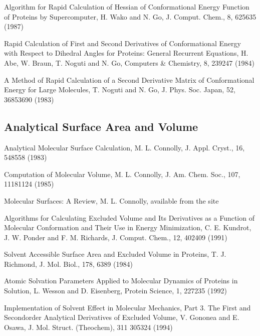 \documentclass[letterpaper,11pt,english]{sphinxmanual}
\begin{document}
\sphinxAtStartPar
Algorithm for Rapid Calculation of Hessian of Conformational Energy Function of Proteins by Supercomputer, H. Wako and N. Go, J. Comput. Chem., 8, 625\sphinxhyphen{}635 (1987)

\sphinxAtStartPar
Rapid Calculation of First and Second Derivatives of Conformational Energy with Respect to Dihedral Angles for Proteins: General Recurrent Equations, H. Abe, W. Braun, T. Noguti and N. Go, Computers \& Chemistry, 8, 239\sphinxhyphen{}247 (1984)

\sphinxAtStartPar
A Method of Rapid Calculation of a Second Derivative Matrix of Conformational Energy for Large Molecules, T. Noguti and N. Go, J. Phys. Soc. Japan, 52, 3685\sphinxhyphen{}3690 (1983)


\subsection{Analytical Surface Area and Volume}
\label{\detokenize{text/references:analytical-surface-area-and-volume}}
\sphinxAtStartPar
Analytical Molecular Surface Calculation, M. L. Connolly, J. Appl. Cryst., 16, 548\sphinxhyphen{}558 (1983)

\sphinxAtStartPar
Computation of Molecular Volume, M. L. Connolly, J. Am. Chem. Soc., 107, 1118\sphinxhyphen{}1124 (1985)

\sphinxAtStartPar
Molecular Surfaces: A Review, M. L. Connolly, available from the site 

\sphinxAtStartPar
Algorithms for Calculating Excluded Volume and Its Derivatives as a Function of Molecular Conformation and Their Use in Energy Minimization, C. E. Kundrot, J. W. Ponder and F. M. Richards, J. Comput. Chem., 12, 402\sphinxhyphen{}409 (1991)

\sphinxAtStartPar
Solvent Accessible Surface Area and Excluded Volume in Proteins, T. J. Richmond, J. Mol. Biol., 178, 63\sphinxhyphen{}89 (1984)

\sphinxAtStartPar
Atomic Solvation Parameters Applied to Molecular Dynamics of Proteins in Solution, L. Wesson and D. Eisenberg, Protein Science, 1, 227\sphinxhyphen{}235 (1992)

\sphinxAtStartPar
Implementation of Solvent Effect in Molecular Mechanics, Part 3. The First\sphinxhyphen{} and Second\sphinxhyphen{}order Analytical Derivatives of Excluded Volume, V. Gononea and E. Osawa, J. Mol. Struct. (Theochem), 311 305\sphinxhyphen{}324 (1994)
\end{document}
